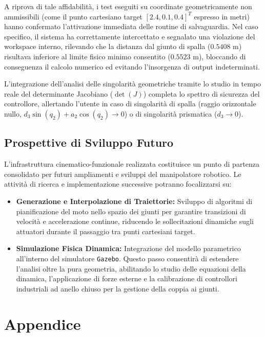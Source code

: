 \documentclass[11pt, a4paper]{report}
\begin{document}
A riprova di tale affidabilità, i test eseguiti su coordinate geometricamente non ammissibili (come il punto cartesiano target \([2.4, 0.1, 0.4]^T\) espresso in metri) hanno confermato l'attivazione immediata delle routine di salvaguardia. Nel caso specifico, il sistema ha correttamente intercettato e segnalato una violazione del workspace interno, rilevando che la distanza dal giunto di spalla (\(0.5408\) m) risultava inferiore al limite fisico minimo consentito (\(0.5523\) m), bloccando di conseguenza il calcolo numerico ed evitando l'insorgenza di output indeterminati.

L'integrazione dell'analisi delle singolarità geometriche tramite lo studio in tempo reale del determinante Jacobiano (\(\det(J)\)) completa lo spettro di sicurezza del controllore, allertando l'utente in caso di singolarità di spalla (raggio orizzontale nullo, \(d_3 \sin(q_2) + a_2 \cos(q_2) \to 0\)) o di singolarità prismatica (\(d_3 \to 0\)).
\newpage
\section{Prospettive di Sviluppo Futuro}
L'infrastruttura cinematico-funzionale realizzata costituisce un punto di partenza consolidato per futuri ampliamenti e sviluppi del manipolatore robotico. Le attività di ricerca e implementazione successive potranno focalizzarsi su:
\begin{itemize}
    \item \textbf{Generazione e Interpolazione di Traiettorie:} Sviluppo di algoritmi di pianificazione del moto nello spazio dei giunti per garantire transizioni di velocità e accelerazione continue, riducendo le sollecitazioni dinamiche sugli attuatori durante il passaggio tra punti cartesiani target.

    \item \textbf{Simulazione Fisica Dinamica:} Integrazione del modello parametrico all'interno del simulatore \texttt{Gazebo}. Questo passo consentirà di estendere l'analisi oltre la pura geometria, abilitando lo studio delle equazioni della dinamica, l'applicazione di forze esterne e la calibrazione di controllori industriali ad anello chiuso per la gestione della coppia ai giunti.
\end{itemize}

\appendix


\chapter{Appendice}
\end{document}
